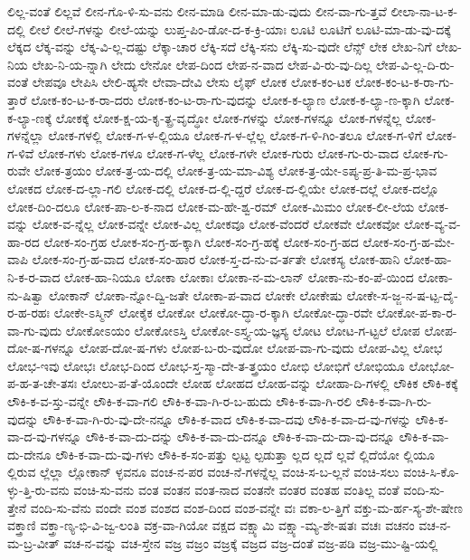 {ಲಿಲ್ಲ-ವಂತೆ
ಲಿಲ್ಲವೆ
ಲೀನ-ಗೊ-ಳಿ-ಸು-ವನು
ಲೀನ-ಮಾಡಿ
ಲೀನ-ಮಾ-ಡು-ವುದು
ಲೀನ-ವಾ-ಗು-ತ್ತವೆ
ಲೀಲಾ-ನಾ-ಟ-ಕ-ದಲ್ಲಿ
ಲೀಲೆ
ಲೀಲೆ-ಗಳನ್ನು
ಲೀಲೆ-ಯನ್ನು
ಲುಪ್ತ-ಪಿಂ-ಡೋ-ದ-ಕ-ಕ್ರಿ-ಯಾಃ
ಲೂಟಿ
ಲೂಟಿಗೆ
ಲೂಟಿ-ಮಾ-ಡು-ವು-ದಕ್ಕೆ
ಲೆಕ್ಕದ
ಲೆಕ್ಕ-ವನ್ನು
ಲೆಕ್ಕ-ವಿ-ಲ್ಲ-ದಷ್ಟು
ಲೆಕ್ಕಾ-ಚಾರ
ಲೆಕ್ಕಿ-ಸದೆ
ಲೆಕ್ಕಿ-ಸನು
ಲೆಕ್ಕಿ-ಸು-ವುದೇ
ಲೆನ್ಸ್
ಲೇಕ
ಲೇಖ-ನಿಗೆ
ಲೇಖ-ನಿಯ
ಲೇಖ-ನಿ-ಯ-ನ್ನಾಗಿ
ಲೇದು
ಲೇನೋ
ಲೇಪ-ದಿಂದ
ಲೇಪ-ನ-ವಾದ
ಲೇಪ-ವಿ-ರು-ವು-ದಿಲ್ಲ
ಲೇಪ-ವಿ-ಲ್ಲ-ದಿ-ರು-ವಂತೆ
ಲೇಪವೂ
ಲೇಪಿಸಿ
ಲೇಲಿ-ಹ್ಯಸೇ
ಲೇವಾ-ದೇವಿ
ಲೇಸು
ಲೈಫ್
ಲೋಕ
ಲೋಕ-ಕಂ-ಟಕ
ಲೋಕ-ಕಂ-ಟ-ಕ-ರಾ-ಗು-ತ್ತಾರೆ
ಲೋಕ-ಕಂ-ಟ-ಕ-ರಾ-ದರು
ಲೋಕ-ಕಂ-ಟ-ರಾ-ಗು-ವುದನ್ನು
ಲೋಕ-ಕ-ಲ್ಯಾಣ
ಲೋಕ-ಕ-ಲ್ಯಾ-ಣ-ಕ್ಕಾಗಿ
ಲೋಕ-ಕ-ಲ್ಯಾ-ಣಕ್ಕೆ
ಲೋಕಕ್ಕೆ
ಲೋಕ-ಕ್ಷ-ಯ-ಕೃ-ತ್ಪ್ರ-ವೃದ್ಧೋ
ಲೋಕ-ಗಳನ್ನು
ಲೋಕ-ಗಳನ್ನೂ
ಲೋಕ-ಗಳನ್ನೆಲ್ಲ
ಲೋಕ-ಗಳನ್ನೆಲ್ಲಾ
ಲೋಕ-ಗಳಲ್ಲಿ
ಲೋಕ-ಗ-ಳ-ಲ್ಲಿಯೂ
ಲೋಕ-ಗ-ಳ-ಲ್ಲೆಲ್ಲ
ಲೋಕ-ಗ-ಳಿ-ಗಿಂ-ತಲೂ
ಲೋಕ-ಗ-ಳಿಗೆ
ಲೋಕ-ಗ-ಳಿವೆ
ಲೋಕ-ಗಳು
ಲೋಕ-ಗಳೂ
ಲೋಕ-ಗ-ಳೆಲ್ಲ
ಲೋಕ-ಗಳೇ
ಲೋಕ-ಗುರು
ಲೋಕ-ಗು-ರು-ವಾದ
ಲೋಕ-ಗು-ರುವೇ
ಲೋಕ-ತ್ರಯಂ
ಲೋಕ-ತ್ರ-ಯ-ದಲ್ಲಿ
ಲೋಕ-ತ್ರ-ಯ-ಮಾ-ವಿಶ್ಯ
ಲೋಕ-ತ್ರ-ಯೇ-ಽಪ್ಯ-ಪ್ರ-ತಿ-ಮ-ಪ್ರ-ಭಾವ
ಲೋಕದ
ಲೋಕ-ದ-ಲ್ಲಾ-ಗಲಿ
ಲೋಕ-ದಲ್ಲಿ
ಲೋಕ-ದ-ಲ್ಲಿ-ದ್ದರೆ
ಲೋಕ-ದ-ಲ್ಲಿಯೇ
ಲೋಕ-ದಲ್ಲೆ
ಲೋಕ-ದಲ್ಲೊ
ಲೋಕ-ದಿಂ-ದಲೂ
ಲೋಕ-ಪಾ-ಲ-ಕ-ನಾದ
ಲೋಕ-ಮ-ಹೇ-ಶ್ವ-ರಮ್
ಲೋಕ-ಮಿಮಂ
ಲೋಕ-ಲೀ-ಲೆಯ
ಲೋಕ-ವನ್ನು
ಲೋಕ-ವ-ನ್ನೆಲ್ಲ
ಲೋಕ-ವನ್ನೇ
ಲೋಕ-ವಿಲ್ಲ
ಲೋಕವೂ
ಲೋಕ-ವೆಂದರೆ
ಲೋಕವೇ
ಲೋಕವೋ
ಲೋಕ-ವ್ಯ-ವ-ಹಾ-ರದ
ಲೋಕ-ಸಂ-ಗ್ರಹ
ಲೋಕ-ಸಂ-ಗ್ರ-ಹ-ಕ್ಕಾಗಿ
ಲೋಕ-ಸಂ-ಗ್ರ-ಹಕ್ಕೆ
ಲೋಕ-ಸಂ-ಗ್ರ-ಹದ
ಲೋಕ-ಸಂ-ಗ್ರ-ಹ-ಮೇ-ವಾಪಿ
ಲೋಕ-ಸಂ-ಗ್ರ-ಹ-ವಾದ
ಲೋಕ-ಸಂ-ಹಾರ
ಲೋಕ-ಸ್ತ-ದ-ನು-ವ-ರ್ತತೇ
ಲೋಕಸ್ಯ
ಲೋಕ-ಹಾನಿ
ಲೋಕ-ಹಾ-ನಿ-ಕ-ರ-ವಾದ
ಲೋಕ-ಹಾ-ನಿಯೂ
ಲೋಕಾ
ಲೋಕಾಃ
ಲೋಕಾ-ನ-ಮ-ಲಾನ್
ಲೋಕಾ-ನು-ಕಂ-ಪೆ-ಯಿಂದ
ಲೋಕಾ-ನು-ಷಿತ್ವಾ
ಲೋಕಾನ್
ಲೋಕಾ-ನ್ನೋ-ದ್ವಿ-ಜತೇ
ಲೋಕಾ-ಪ-ವಾದ
ಲೋಕೇ
ಲೋಕೇಷು
ಲೋಕೇ-ಸ-ಜ್ಜ-ನ-ಷ-ಟ್ಪ-ದೈ-ರ-ಹ-ರಹಃ
ಲೋಕೇ-ಽಸ್ಮಿನ್
ಲೋಕೈಕ
ಲೋಕೋ
ಲೋಕೋ-ದ್ಧಾ-ರ-ಕ್ಕಾಗಿ
ಲೋಕೋ-ದ್ಧಾ-ರವೇ
ಲೋಕೋ-ಪ-ಕಾ-ರ-ವಾ-ಗು-ವುದು
ಲೋಕೋಽಯಂ
ಲೋಕೋಽಸ್ತಿ
ಲೋಕೋ-ಽಸ್ತ್ಯ-ಯ-ಜ್ಞಸ್ಯ
ಲೋಟ
ಲೋಟ-ಗ-ಟ್ಟಲೆ
ಲೋಪ
ಲೋಪ-ದೋ-ಷ-ಗಳನ್ನೂ
ಲೋಪ-ದೋ-ಷ-ಗಳು
ಲೋಪ-ಬ-ರು-ವುದೋ
ಲೋಪ-ವಾ-ಗು-ವುದು
ಲೋಪ-ವಿಲ್ಲ
ಲೋಭ
ಲೋಭ-ಇವು
ಲೋಭಃ
ಲೋಭ-ದಿಂದ
ಲೋಭ-ಸ್ತ-ಸ್ಮಾ-ದೇ-ತ-ತ್ತ್ರಯಂ
ಲೋಭಿ
ಲೋಭಿಗೆ
ಲೋಭಿಯೂ
ಲೋಭೋ-ಪ-ಹ-ತ-ಚೇ-ತಸಃ
ಲೋಲು-ಪ-ತೆ-ಯೊಂದೇ
ಲೋಹ
ಲೋಹದ
ಲೋಹ-ವನ್ನು
ಲೋಹಾ-ದಿ-ಗಳಲ್ಲಿ
ಲೌಕಿಕ
ಲೌಕಿ-ಕಕ್ಕೆ
ಲೌಕಿ-ಕ-ವ-ಸ್ತು-ವನ್ನೇ
ಲೌಕಿ-ಕ-ವಾ-ಗಲಿ
ಲೌಕಿ-ಕ-ವಾ-ಗಿ-ರ-ಬ-ಹುದು
ಲೌಕಿ-ಕ-ವಾ-ಗಿ-ರಲಿ
ಲೌಕಿ-ಕ-ವಾ-ಗಿ-ರು-ವುದನ್ನು
ಲೌಕಿ-ಕ-ವಾ-ಗಿ-ರು-ವು-ದೇ-ನನ್ನೂ
ಲೌಕಿ-ಕ-ವಾದ
ಲೌಕಿ-ಕ-ವಾ-ದವು
ಲೌಕಿ-ಕ-ವಾ-ದ-ವು-ಗಳನ್ನು
ಲೌಕಿ-ಕ-ವಾ-ದ-ವು-ಗಳನ್ನೂ
ಲೌಕಿ-ಕ-ವಾ-ದು-ದನ್ನು
ಲೌಕಿ-ಕ-ವಾ-ದು-ದನ್ನೂ
ಲೌಕಿ-ಕ-ವಾ-ದು-ದಾ-ವು-ದನ್ನೂ
ಲೌಕಿ-ಕ-ವಾ-ದು-ದೇನೂ
ಲೌಕಿ-ಕ-ವಾ-ದು-ವು-ಗಳು
ಲೌಕಿ-ಕ-ಸಂ-ಪತ್ತು
ಲ್ಪಟ್ಟ
ಲ್ಪಡುತ್ತಾ
ಲ್ಲದ
ಲ್ಲದೆ
ಲ್ಲವೆ
ಲ್ಲಿದೆಯೋ
ಲ್ಲಿಯೂ
ಲ್ಲಿರುವ
ಲ್ಲೆಲ್ಲಾ
ಲ್ಲೋಕಾನ್
ಳ್ಳವನೂ
ವಂಚ-ನ-ಪರ
ವಂಚ-ನೆ-ಗಳನ್ನೆಲ್ಲ
ವಂಚಿ-ಸ-ಬ-ಲ್ಲನೆ
ವಂಚಿ-ಸಲು
ವಂಚಿ-ಸಿ-ಕೊ-ಳ್ಳು-ತ್ತಿ-ರು-ವನು
ವಂಚಿ-ಸು-ವನು
ವಂತ
ವಂತನ
ವಂತ-ನಾದ
ವಂತನೇ
ವಂತರ
ವಂತಹ
ವಂತಿಲ್ಲ
ವಂತೆ
ವಂದಿ-ಸು-ತ್ತೇನೆ
ವಂದಿ-ಸು-ವೆನು
ವಂದೇ
ವಂಶ
ವಂಶದ
ವಂಶ-ದಿಂದ
ವಂಶ-ವನ್ನೇ
ವಃ
ವಕಾ-ಲ-ತ್ತಿಗೆ
ವಕ್ತು-ಮ-ರ್ಹ-ಸ್ಯ-ಶೇ-ಷೇಣ
ವಕ್ತ್ರಾಣಿ
ವಕ್ತ್ರಾ-ಣ್ಯ-ಭಿ-ವಿ-ಜ್ವ-ಲಂತಿ
ವಕ್ರ-ವಾ-ಗಿಯೋ
ವಕ್ಷದ
ವಕ್ಷ್ಯಾಮಿ
ವಕ್ಷ್ಯಾ-ಮ್ಯ-ಶೇ-ಷತಃ
ವಚಃ
ವಚನಂ
ವಚ-ನ-ಮ-ಬ್ರ-ವೀತ್
ವಚ-ನ-ವನ್ನು
ವಚ-ಸ್ತೇನ
ವಜ್ರ
ವಜ್ರಂ
ವಜ್ರಕ್ಕೆ
ವಜ್ರದ
ವಜ್ರ-ದಂತೆ
ವಜ್ರ-ಪಡಿ
ವಜ್ರ-ಮು-ಷ್ಟಿ-ಯಲ್ಲಿ
}
